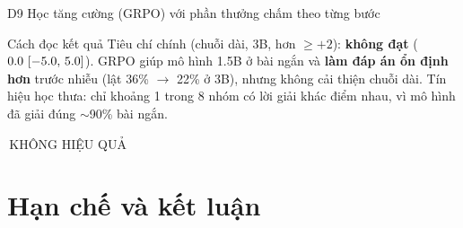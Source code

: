 \documentclass[aspectratio=169,t]{beamer}
\newcommand{\nhanS}[2]{{\setlength{\fboxsep}{0.8pt}\colorbox{#1}{\tiny\bfseries\color{white}\rule[-1.1pt]{0pt}{5.6pt}\,#2\,}}}
\newcommand{\FAILs}{\nhanS{failc}{KHÔNG HIỆU QUẢ}}
\newcommand{\ci}[2]{{\tiny[#1,\,#2]}}
\begin{document}
\begin{frame}[shrink]{D9 \textperiodcentered{} Học tăng cường (GRPO) với phần thưởng chấm theo từng bước}
\begin{exampleblock}{Cách đọc kết quả}
\footnotesize Tiêu chí chính (chuỗi dài, 3B, hơn $\ge+2$): \textbf{không đạt} ($0.0\ \ci{-5.0}{5.0}$). GRPO giúp mô hình 1.5B ở bài ngắn và \textbf{làm đáp án ổn định hơn} trước nhiễu (lật 36\% $\to$ 22\% ở 3B), nhưng không cải thiện chuỗi dài. Tín hiệu học thưa: chỉ khoảng 1 trong 8 nhóm có lời giải khác điểm nhau, vì mô hình đã giải đúng $\sim$90\% bài ngắn. \FAILs
\end{exampleblock}
\par\kern0pt
\end{frame}


\section{Hạn chế và kết luận}
\end{document}

